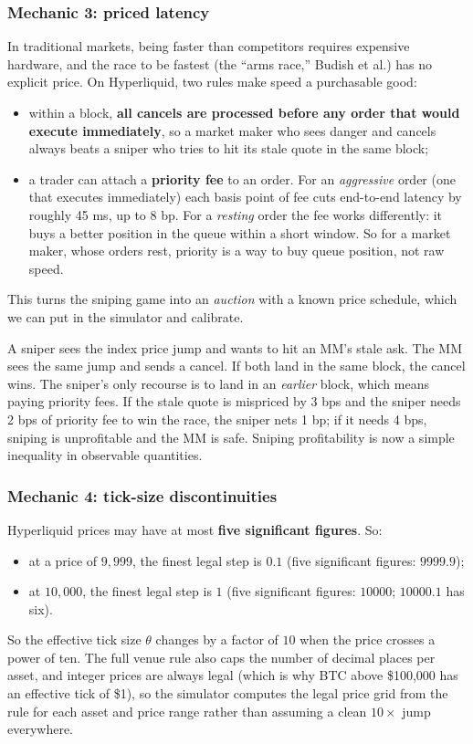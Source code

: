 \documentclass[11pt]{article}
\begin{document}
\subsubsection{Mechanic 3: priced latency}
In traditional markets, being faster than competitors requires expensive hardware, and the race to be fastest (the ``arms race,'' Budish et al.) has no explicit price. On Hyperliquid, two rules make speed a purchasable good:
\begin{itemize}
\item within a block, \textbf{all cancels are processed before any order that would execute immediately}, so a market maker who sees danger and cancels always beats a sniper who tries to hit its stale quote in the same block;
\item a trader can attach a \textbf{priority fee} to an order. For an \emph{aggressive} order (one that executes immediately) each basis point of fee cuts end-to-end latency by roughly 45 ms, up to 8 bp. For a \emph{resting} order the fee works differently: it buys a better position in the queue within a short window. So for a market maker, whose orders rest, priority is a way to buy queue position, not raw speed.
\end{itemize}
This turns the sniping game into an \emph{auction} with a known price schedule, which we can put in the simulator and calibrate.

\begin{example}
A sniper sees the index price jump and wants to hit an MM's stale ask. The MM sees the same jump and sends a cancel. If both land in the same block, the cancel wins. The sniper's only recourse is to land in an \emph{earlier} block, which means paying priority fees. If the stale quote is mispriced by 3 bps and the sniper needs 2 bps of priority fee to win the race, the sniper nets 1 bp; if it needs 4 bps, sniping is unprofitable and the MM is safe. Sniping profitability is now a simple inequality in observable quantities.
\end{example}

\subsubsection{Mechanic 4: tick-size discontinuities}\label{sec:tick}
Hyperliquid prices may have at most \textbf{five significant figures}. So:
\begin{itemize}
\item at a price of $9{,}999$, the finest legal step is $0.1$ (five significant figures: $9999.9$);
\item at $10{,}000$, the finest legal step is $1$ (five significant figures: $10000$; $10000.1$ has six).
\end{itemize}
So the effective tick size $\theta$ changes by a factor of $10$ when the price crosses a power of ten. The full venue rule also caps the number of decimal places per asset, and integer prices are always legal (which is why BTC above \$100{,}000 has an effective tick of \$1), so the simulator computes the legal price grid from the rule for each asset and price range rather than assuming a clean $10\times$ jump everywhere.
\end{document}
